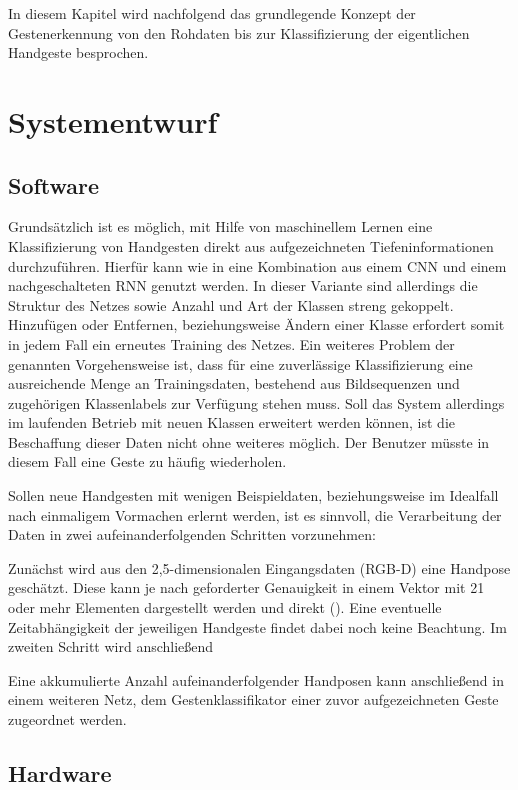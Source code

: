 In diesem Kapitel wird nachfolgend das grundlegende Konzept der Gestenerkennung von den Rohdaten bis zur Klassifizierung der eigentlichen Handgeste besprochen.

\section{Systementwurf}

\subsection{Software}
Grundsätzlich ist es möglich, mit Hilfe von maschinellem Lernen eine Klassifizierung von Handgesten direkt aus aufgezeichneten Tiefeninformationen durchzuführen. Hierfür kann wie in \cite{Molchanov2016} eine Kombination aus einem CNN und einem nachgeschalteten RNN genutzt werden. In dieser Variante  sind allerdings die Struktur des Netzes sowie Anzahl und Art der Klassen streng gekoppelt. Hinzufügen oder Entfernen, beziehungsweise Ändern einer Klasse erfordert somit in jedem Fall ein erneutes Training des Netzes.
Ein weiteres Problem der genannten Vorgehensweise ist, dass für eine zuverlässige Klassifizierung eine ausreichende Menge an Trainingsdaten, bestehend aus Bildsequenzen und zugehörigen Klassenlabels zur Verfügung stehen muss. Soll das System allerdings im laufenden Betrieb mit neuen Klassen erweitert werden können, ist die Beschaffung dieser Daten nicht ohne weiteres möglich. Der Benutzer müsste in diesem Fall eine Geste zu häufig wiederholen.

Sollen neue Handgesten mit wenigen Beispieldaten, beziehungsweise im Idealfall nach einmaligem Vormachen erlernt werden, ist es sinnvoll, die Verarbeitung der Daten in zwei aufeinanderfolgenden Schritten vorzunehmen:

Zunächst wird aus den 2,5-dimensionalen Eingangsdaten (RGB-D) eine Handpose geschätzt. Diese kann je nach geforderter Genauigkeit in einem Vektor mit 21 oder mehr Elementen dargestellt werden und direkt (). Eine eventuelle Zeitabhängigkeit der jeweiligen Handgeste findet dabei noch keine Beachtung. 
Im zweiten Schritt wird anschließend

Eine akkumulierte Anzahl aufeinanderfolgender Handposen kann anschließend in einem weiteren Netz, dem Gestenklassifikator einer zuvor aufgezeichneten Geste zugeordnet werden.


\begin{figure}
	\centering
	
	\caption{}
	\label{fig:software-net-structure-blackbox}
\end{figure}


\subsection{Hardware}

